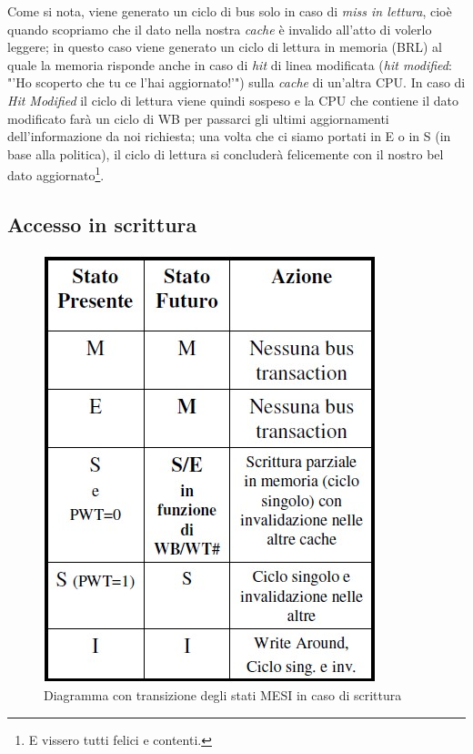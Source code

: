 Come si nota, viene generato un ciclo di bus solo in caso di \textit{miss in lettura}, cioè quando scopriamo che il dato nella nostra \textit{cache} è invalido all'atto di volerlo leggere; in questo caso viene generato un ciclo di lettura in memoria (BRL) al quale la memoria risponde anche in caso di \textit{hit} di linea modificata (\textit{hit modified}: "'Ho scoperto che tu ce l'hai aggiornato!'") sulla \textit{cache} di un'altra CPU. In caso di \textit{Hit Modified} il ciclo di lettura viene quindi sospeso e la CPU che contiene il dato modificato farà un ciclo di WB per passarci gli ultimi aggiornamenti dell'informazione da noi richiesta; una volta che ci siamo portati in E o in S (in base alla politica), il ciclo di lettura si concluderà felicemente con il nostro bel dato aggiornato\footnote{E vissero tutti felici e contenti.}.

\subsection{Accesso in scrittura}
\label{sec:accessoScrittura}

\begin{figure}[!h]
\centering
\includegraphics[width=0.35\columnwidth]{img/transScrittura}
\caption{Diagramma con transizione degli stati MESI in caso di scrittura}
\label{fig:transScrittura}
\end{figure}


